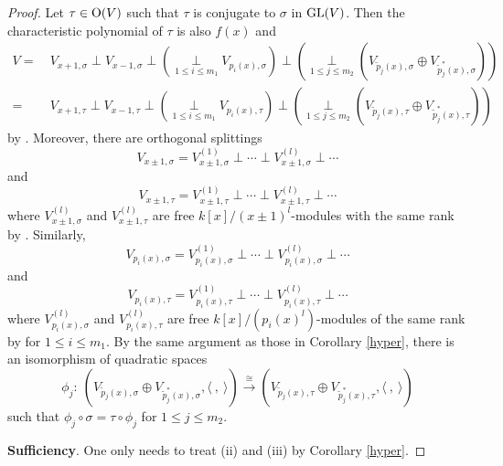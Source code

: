 \documentclass[12pt]{amsart}
\begin{document}
\begin{proof}   
Let $\tau\in {\rm O}(V)$ such that $\tau$ is conjugate to $\sigma$ in ${\rm GL}(V)$. Then the characteristic polynomial of $\tau$ is also $f(x)$ and 
$$ \begin{aligned} V = & \ V_{x+1, \sigma} \perp V_{x-1, \sigma} \perp ( \underset{1\leq i\leq m_1} \perp  V_{p_i(x), \sigma}) \perp (\underset{1\leq j\leq m_2} \perp (V_{\tilde{p}_ j(x), \sigma}\oplus V_{\tilde{p}_ j^*(x), \sigma})) \\
= & \ V_{x+1, \tau} \perp V_{x-1, \tau} \perp ( \underset{1\leq i\leq m_1} \perp  V_{p_i(x), \tau}) \perp (\underset{1\leq j\leq m_2} \perp (V_{\tilde{p}_ j(x), \tau}\oplus V_{\tilde{p}_ j^*(x), \tau})) \end{aligned}$$
by \cite[Lemma 3.1]{Mil}.  Moreover, there are orthogonal splittings 
$$ V_{x\pm1, \sigma} = V_{x\pm 1, \sigma }^{(1)} \perp \cdots \perp V_{x\pm 1, \sigma }^{(l)} \perp \cdots $$
and 
$$ V_{x\pm1, \tau} = V_{x\pm 1, \tau}^{(1)} \perp \cdots \perp V_{x\pm 1, \tau}^{(l)} \perp \cdots $$
where $V_{x\pm 1, \sigma }^{(l)}$ and $V_{x\pm 1, \tau}^{(l)}$ are  free $k[x]/(x\pm 1)^l$-modules with the same rank by \cite[Theorem 3.2]{Mil}. Similarly, 
$$ V_{p_i(x), \sigma} = V_{p_i(x), \sigma}^{(1)} \perp \cdots \perp V_{p_i(x), \sigma}^{(l)}\perp \cdots $$
and 
$$ V_{p_i(x), \tau} = V_{p_i(x), \tau}^{(1)} \perp \cdots \perp V_{p_i(x), \tau}^{(l)}\perp \cdots $$
where $V_{p_i(x), \sigma}^{(l)}$ and $V_{p_i(x), \tau}^{(l)}$ are free $k[x]/(p_i(x)^l)$-modules of the same rank by \cite[Theorem 3.2]{Mil} for $1\leq i\leq m_1$. By the same argument as those in Corollary \ref{hyper},  there is an isomorphism of quadratic spaces
$$ \phi_j : \ (V_{\tilde{p}_ j(x), \sigma}\oplus V_{\tilde{p}_ j^*(x), \sigma}, \langle \  , \  \rangle ) \xrightarrow{\cong} (V_{\tilde{p}_ j(x), \tau}\oplus V_{\tilde{p}_ j^*(x), \tau}, \langle \  , \  \rangle) $$
such that $\phi_j \circ \sigma= \tau \circ \phi_j$ for $1\leq j\leq m_2$. 

\medskip


{\bf Sufficiency}. One only needs to treat (ii) and (iii) by Corollary \ref{hyper}.

\medskip


\end{proof}
\end{document}
